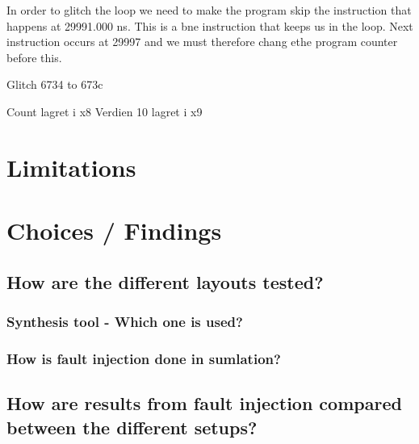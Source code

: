 In order to glitch the loop we need to make the program skip the instruction that happens at 29991.000 ns. This is a bne instruction that keeps us in the loop. Next instruction occurs at 29997 and we must therefore chang ethe program counter before this. 

Glitch 6734 to 673c

Count lagret i x8 
Verdien 10 lagret i x9

\section{Limitations}
\label{sec:limit}

\section{Choices / Findings}
\label{sec:choice}

\subsection{How are the different layouts tested?}
\subsubsection{Synthesis tool - Which one is used?}
\subsubsection{How is fault injection done in sumlation?}
\subsection{How are results from fault injection compared between the different setups?}
